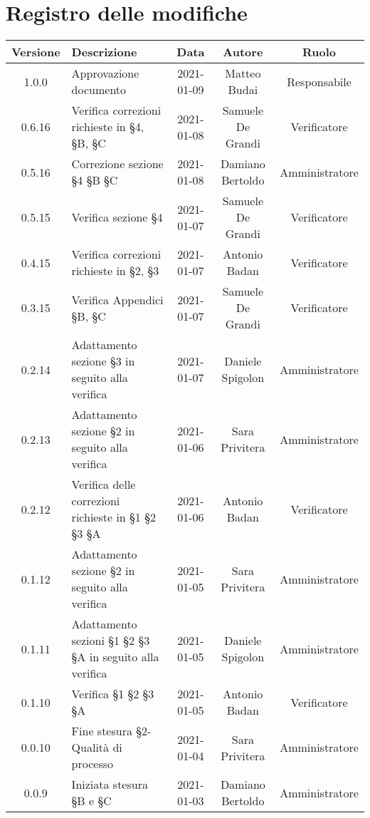 \section*{Registro delle modifiche}

\begin{center}
	\begin{longtable}{|c|p{5cm}|c|c|c|}
	\hline
	\rowcolor{lighter-grayer}
	\textbf{Versione} & \textbf{Descrizione} & \textbf{Data} & \textbf{Autore} & \textbf{Ruolo} \\
	\hline
	\endfirsthead

	1.0.0 & Approvazione documento & 2021-01-09 & Matteo Budai & Responsabile \\
	\hline
	0.6.16 & Verifica correzioni richieste in §4, §B, §C  & 2021-01-08 & Samuele De Grandi & Verificatore \\
	\hline
	0.5.16 & Correzione sezione §4 §B §C  & 2021-01-08 & Damiano Bertoldo & Amministratore \\
	\hline
	0.5.15 & Verifica sezione §4  & 2021-01-07 & Samuele De Grandi & Verificatore \\
	\hline
	0.4.15 & Verifica correzioni richieste in §2, §3  & 2021-01-07 & Antonio Badan & Verificatore \\
	\hline
	0.3.15 & Verifica Appendici §B, §C  & 2021-01-07 & Samuele De Grandi & Verificatore \\
	\hline
	0.2.14 & Adattamento sezione §3 in seguito alla verifica & 2021-01-07 & Daniele Spigolon & Amministratore \\
	\hline
	0.2.13 & Adattamento sezione §2 in seguito alla verifica & 2021-01-06 & Sara Privitera & Amministratore \\
	\hline
	0.2.12 & Verifica delle correzioni richieste in §1 §2 §3 §A & 2021-01-06 & Antonio Badan & Verificatore \\
	\hline
	0.1.12 & Adattamento sezione §2 in seguito alla verifica & 2021-01-05 & Sara Privitera & Amministratore \\
	\hline
	0.1.11 & Adattamento sezioni §1 §2 §3 §A in seguito alla verifica & 2021-01-05 & Daniele Spigolon & Amministratore \\
	\hline
	0.1.10 & Verifica §1 §2 §3 §A & 2021-01-05 & Antonio Badan & Verificatore \\
	\hline
	0.0.10 & Fine stesura §2-Qualità di processo & 2021-01-04 & Sara Privitera & Amministratore \\
	\hline
	0.0.9 & Iniziata stesura §B e §C & 2021-01-03 & Damiano Bertoldo & Amministratore \\

\end{longtable}
\end{center}
